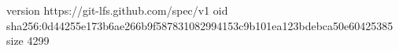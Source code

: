version https://git-lfs.github.com/spec/v1
oid sha256:0d44255e173b6ae266b9f587831082994153c9b101ea123bdebca50e60425385
size 4299
